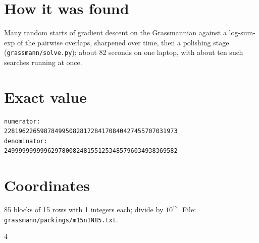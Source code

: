\documentclass[11pt,a4paper]{article}
\begin{document}
\section{How it was found}
Many random starts of gradient descent on the Grassmannian against a log-sum-exp of the pairwise overlaps, sharpened over time, then a polishing stage (\texttt{grassmann/solve.py}); about 82 seconds on one laptop, with about ten such searches running at once.


\appendix
\section{Exact value}
{\small
\begin{verbatim}
numerator:
228196226598784995082817284170840427455707031973
denominator:
249999999999629780082481551253485796034938369582
\end{verbatim}}

\section{Coordinates}
85 blocks of 15 rows with 1 integers each; divide by $10^{12}$. File: \texttt{grassmann/packings/m15n1N85.txt}.
{\tiny
\begin{multicols}{4}
\end{multicols}}
\end{document}
